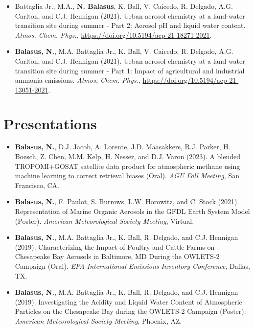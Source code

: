 \documentclass[10pt]{article}
\begin{document}
\begin{itemize}
    \item Battaglia Jr., M.A., \textbf{N. Balasus}, K. Ball, V. Caicedo, R. Delgado, A.G. Carlton, and C.J. Hennigan (2021). Urban aerosol chemistry at a land-water transition site during summer - Part 2: Aerosol pH and liquid water content. \textit{Atmos. Chem. Phys.}, \href{https://doi.org/10.5194/acp-21-18271-2021}{https://doi.org/10.5194/acp-21-18271-2021}.
    \item \textbf{Balasus, N.}, M.A. Battaglia Jr., K. Ball, V. Caicedo, R. Delgado, A.G. Carlton, and C.J. Hennigan (2021). Urban aerosol chemistry at a land-water transition site during summer - Part 1: Impact of agricultural and industrial ammonia emissions. \textit{Atmos. Chem. Phys.}, \href{https://doi.org/10.5194/acp-21-13051-2021}{https://doi.org/10.5194/acp-21-13051-2021}.
\end{itemize}

\section*{Presentations}
\begin{itemize}
    \itemsep0em
    \item \textbf{Balasus, N.}, D.J. Jacob, A. Lorente, J.D. Maasakkers, R.J. Parker, H. Boesch, Z. Chen, M.M. Kelp, H. Nesser, and D.J. Varon (2023). A blended TROPOMI+GOSAT satellite data product for atmospheric methane using machine learning to correct retrieval biases (Oral). \textit{AGU Fall Meeting}, San Francisco, CA.
    \item \textbf{Balasus, N.}, F. Paulot, S. Burrows, L.W. Horowitz, and C. Stock (2021). Representation of Marine Organic Aerosols in the GFDL Earth System Model (Poster). \textit{American Meteorological Society Meeting}, Virtual.
    \item \textbf{Balasus, N.}, M.A. Battaglia Jr., K. Ball, R. Delgado, and C.J. Hennigan (2019). Characterizing the Impact of Poultry and Cattle Farms on Chesapeake Bay Aerosols in Baltimore, MD During the OWLETS-2 Campaign (Oral). \textit{EPA International Emissions Inventory Conference}, Dallas, TX.
    \item \textbf{Balasus, N.}, M.A. Battaglia Jr., K. Ball, R. Delgado, and C.J. Hennigan (2019). Investigating the Acidity and Liquid Water Content of Atmospheric Particles on the Chesapeake Bay during the OWLETS-2 Campaign (Poster). \textit{American Meteorological Society Meeting}, Phoenix, AZ.
\end{itemize}
\end{document}
